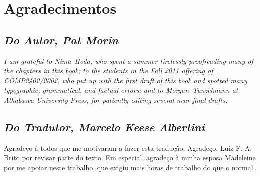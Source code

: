 \chapter*{Agradecimentos}

\section*{\emph{Do Autor, Pat Morin}}

\emph{I am grateful to Nima~Hoda, who spent a summer tirelessly proofreading
many of the chapters in this book; to the students in the Fall 2011
offering of COMP2402/2002, who put up with the first draft of this book
and spotted many typographic, grammatical, and factual errors; and to
Morgan~Tunzelmann at Athabasca University Press, for patiently editing
several near-final drafts.}

\section*{\emph{Do Tradutor, Marcelo Keese Albertini }}

Agradeço à todos que me motivaram a fazer esta tradução. Agradeço, Luiz F. A. Brito por revisar parte do texto.
Em especial, agradeço à minha esposa Madeleine por me apoiar neste trabalho, que exigiu mais horas de trabalho do que o normal.

